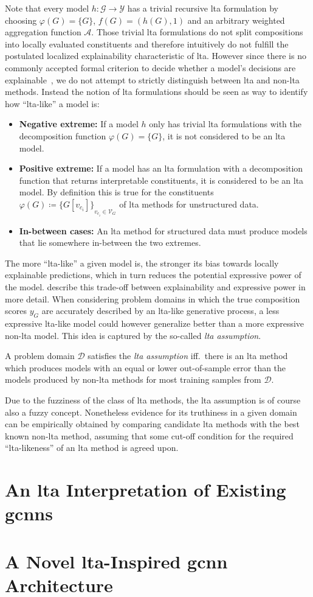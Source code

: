 Note that every model $h: \mathcal{G} \to \mathcal{Y}$ has a trivial recursive \ac{lta} formulation by choosing $\varphi(G) = \{ G \}$, $f(G) = (h(G), 1)$ and an arbitrary weighted aggregation function $\mathcal{A}$.
Those trivial \ac{lta} formulations do not split compositions into locally evaluated constituents and therefore intuitively do not fulfill the postulated localized explainability characteristic of \ac{lta}.
However since there is no commonly accepted formal criterion to decide whether a model's decisions are explainable~\cite{Lipton2018}, we do not attempt to strictly distinguish between \ac{lta} and non-\acs{lta} methods.
Instead the notion of \ac{lta} formulations should be seen as way to identify how ``\acs{lta}-like'' a model is:
\begin{itemize}
	\item \textbf{Negative extreme:}
		If a model $h$ only has trivial \ac{lta} formulations with the decomposition function $\varphi(G) = \{ G \}$, it is not considered to be an \ac{lta} model.
	\item \textbf{Positive extreme:}
		If a model has an \ac{lta} formulation with a decomposition function that returns interpretable constituents, it is considered to be an \ac{lta} model.
		By definition this is true for the constituents $\varphi(G) \coloneqq {\{ G[v_{c_i}] \}}_{v_{c_i} \in \mathcal{V}_G}$ of \ac{lta} methods for unstructured data.
	\item \textbf{In-between cases:}
		An \ac{lta} method for structured data must produce models that lie somewhere in-between the two extremes.
\end{itemize}

The more ``\acs{lta}-like'' a given model is, the stronger its bias towards locally explainable predictions, which in turn reduces the potential expressive power of the model.
\citet{Gilpin2018} describe this trade-off between explainability and expressive power in more detail.
When considering problem domains in which the true composition scores $y_G$ are accurately described by an \acs{lta}-like generative process, a less expressive \ac{lta}-like model could however generalize better than a more expressive non-\ac{lta} model.
This idea is captured by the so-called \textit{\ac{lta} assumption}.
\begin{defn}
	A problem domain $\mathcal{D}$ satisfies the \textit{\ac{lta} assumption} iff.\ there is an \ac{lta} method which produces models with an equal or lower out-of-sample error than the models produced by non-\acs{lta} methods for most training samples from $\mathcal{D}$.
\end{defn}
Due to the fuzziness of the class of \ac{lta} methods, the \ac{lta} assumption is of course also a fuzzy concept.
Nonetheless evidence for its truthiness in a given domain can be empirically obtained by comparing candidate \ac{lta} methods with the best known non-\ac{lta} method, assuming that some cut-off condition for the required ``\ac{lta}-likeness'' of an \ac{lta} method is agreed upon.

\section{An \acs*{lta} Interpretation of Existing \acsp*{gcnn}}%
\label{sec:ltag:interpretation}

\section{A Novel \acs*{lta}-Inspired \acs*{gcnn} Architecture}%
\label{sec:ltag:wl2gnn}

